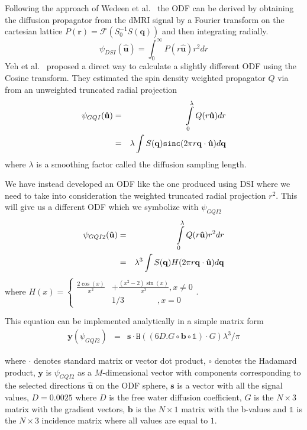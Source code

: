 \documentclass[9pt,conference,a4paper]{IEEEtran}
\begin{document}
Following the approach of Wedeen et al.~\cite{WWS+08} 
the ODF can be derived by obtaining the diffusion propagator from the dMRI signal
by a Fourier transform on the cartesian lattice  $P(\mathbf{r})=\mathcal{F}(S_0^{-1}S(\mathbf{q}))$ and then integrating radially. 
\begin{equation}
\psi_{DSI}(\hat{\mathbf{u}})=\int_{0}^{\infty}P(r\hat{\mathbf{u}})r^{2}dr\label{eq:ODF_DSI}
\end{equation}
Yeh
et al.~\cite{Yeh2010} proposed a direct way to calculate a slightly
different ODF using the Cosine transform. 
They estimated the spin density weighted propagator $Q$ via
from an unweighted truncated radial projection
\begin{eqnarray}
\psi_{GQI}(\mathbf{\hat{u}}) & = & \intop_{0}^{\lambda}Q(r\mathbf{\hat{u}})dr\label{eq:SDF}\nonumber\\
 & = & \lambda\int S(\mathbf{q})\mathtt{sinc}(2\pi r\mathbf{q}\cdot\mathbf{\hat{u}})d\mathbf{q}
\end{eqnarray}
where $\lambda$ is a smoothing factor called the diffusion sampling length.

We have instead developed an ODF like the one produced using
DSI where we need to take into consideration the weighted truncated
radial projection $r^2$. This will give us a different ODF which we symbolize
with $\psi_{GQI2}$\begin{eqnarray}
\psi_{GQI2}(\mathbf{\hat{u}}) & = & \intop_{0}^{\lambda}Q(r\mathbf{\hat{u}})r^{2}dr\nonumber\label{eq:SDF2}\\
 & = & \lambda^{3}\int S(\mathbf{q})H(2\pi r\mathbf{q}\cdot\mathbf{\hat{u}})d\mathbf{q}\end{eqnarray}
\noindent where $H(x)=\begin{cases}
\frac{2\cos(x)}{x^{2}} & +\frac{(x^{2}-2)\sin(x)}{x^{3}},x\neq0\\
 & 1/3\qquad\qquad,x=0\end{cases}$.
\begin{flushleft}
This equation can be implemented analytically in a simple matrix form
\begin{eqnarray}
\mathbf{y}({\psi}_{GQI2}) & = & \mathbf{s}\cdot\mathtt{H}((6D.G\circ\mathbf{b}\circ\mathbb{1})\cdot G)\lambda^{3}/\pi\label{eq:GQI2}
\end{eqnarray}

\par\end{flushleft}

\begin{flushleft}
where $\cdot$ denotes standard matrix or vector dot product, $\circ$
denotes the Hadamard product, $\mathbf{y}$ is $\psi_{GQI2}$ as a
$M$-dimensional vector with components corresponding to the selected
directions $\hat{\mathbf{u}}$ on the ODF sphere, $\mathbf{s}$ is
a vector with all the signal values, $D=0.0025$
where $D$ is the free water diffusion coefficient,
$G$ is the $N\times3$ matrix with the gradient vectors, $\mathbf{b}$
is the $N\times1$ matrix with the b-values and $\mathbb{1}$ is the
$N\times3$ incidence matrix where all values are equal to $1$.
\par\end{flushleft}
\end{document}
